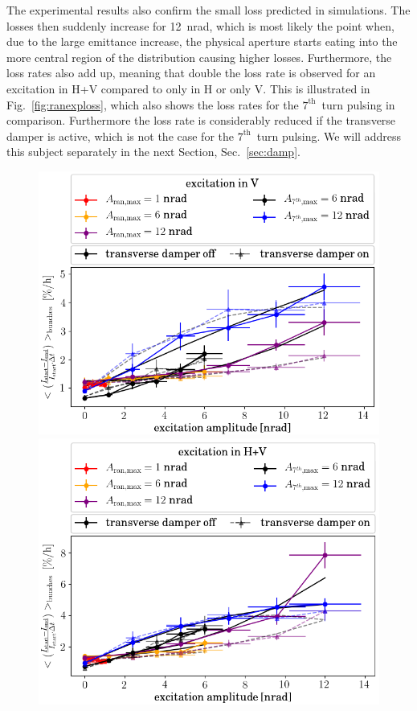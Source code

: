 \documentclass[%
 reprint,
 amsmath,amssymb,
 aps,
prstab,
]{revtex4-1}
\begin{document}
The experimental results also confirm the small loss predicted in simulations. The losses then suddenly increase for 12~nrad, which is most likely the point when, due to the large emittance increase, the physical aperture starts eating into the more central region of the distribution causing higher losses. Furthermore, the loss rates also add up, meaning that double the loss rate is observed for an excitation in H+V compared to only in H or only V. This is illustrated in  Fig.~\ref{fig:ranexploss}, which also shows the loss rates for the $7^{\mathrm{th}}$~turn pulsing in comparison. Furthermore the loss rate is considerably reduced if the transverse damper is active, which is not the case for the $7^{\mathrm{th}}$~turn pulsing. We will address this subject separately in the next Section, Sec.~\ref{sec:damp}.
\begin{figure}[h]
	\begin{minipage}[t]{0.49\linewidth}
		\centering
	\includegraphics[width=1.0\linewidth]{2017_scale_amp_ranv_lbllong.png}
	\end{minipage}	
	\begin{minipage}[t]{0.49\linewidth}
		\centering
		\includegraphics[width=1.0\linewidth]{2017_scale_amp_ranhv_lbllong.png}

\end{minipage}
\end{figure}
\end{document}
